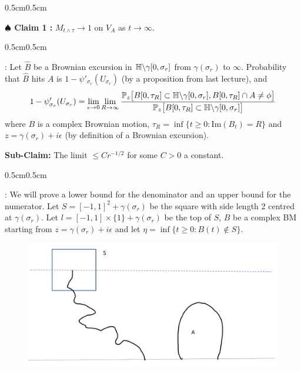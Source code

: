 \documentclass[12pt,a4paper]{article}
\newenvironment{proof}
{\begin{changemargin}{0.5cm}{0.5cm} 
	}%
	{\end{changemargin}
}
\newenvironment{subproof}
{\begin{changemargin}{0.5cm}{0.5cm} 
	}%
	{\end{changemargin}
}
\newenvironment{p}
{\begin{proof} 
	}%
	{\end{proof}
}
\begin{document}
\begin{p}
\textbf{$\spadesuit$ Claim 1 :} $M_{t\wedge \tau} \rightarrow 1$ on $V_A$ as $t\rightarrow \infty$.
\begin{subproof}
: Let $\hat{B}$ be a Brownian excursion in $\mathbb{H} \backslash \gamma [0, \sigma_r]$ from $\gamma(\sigma_r)$ to $\infty$. Probability that $\hat{B}$ hits $A$ is $1- \psi'_{\sigma_r}(U_{\sigma_r})$ (by a proposition from last lecture), and
\begin{align*}
1- \psi'_{\sigma_r}(U_{\sigma_r}) = \lim_{\epsilon \rightarrow 0}\lim_{R\rightarrow \infty}\frac{\mathbb{P}_z \big[ B[0, \tau_R] \subset \mathbb{H} \backslash \gamma [0, \sigma_r], B[0, \tau_R] \cap A \neq \phi \big]}{\mathbb{P}_{z}\big[ B[0, \tau_R] \subset \mathbb{H} \backslash \gamma[0, \sigma_r] \big]}
\end{align*}
where $B$ is a complex Brownian motion, $\tau_R =\inf\{t\geq 0: \text{Im}(B_t)=R\}$ and $z= \gamma(\sigma_r) +i\epsilon$ (by definition of a Brownian excursion).
\vspace{5pt}

\textbf{Sub-Claim:} The limit $\leq Cr^{-1/2}$ for some $C>0$ a constant.
\begin{subproof}
: We will prove a lower bound for the denominator and an upper bound for the numerator. Let $S = [-1, 1]^2 + \gamma(\sigma_r)$ be the square with side length 2 centred at $\gamma(\sigma_r)$. Let $l=[-1,1]\times \{1\} + \gamma(\sigma_r)$ be the top of $S$, $B$ be a complex BM starting from $z= \gamma(\sigma_r) + i\epsilon$ and let $\eta =\inf\{ t\geq 0 : B(t) \not\in S\}$.
\begin{figure}[h]
    \begin{center}
    \includegraphics[scale=0.2]{7}
    \end{center}
\end{figure}


\end{subproof}
\end{subproof}
\end{p}
\end{document}
